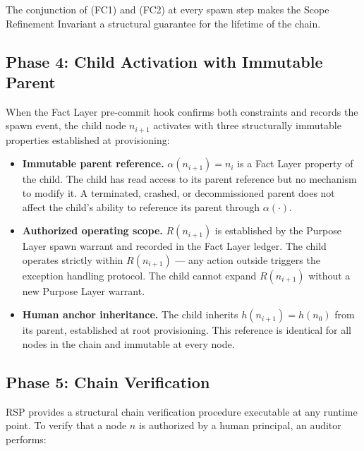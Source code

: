 The conjunction of (FC1) and (FC2) at every spawn step makes the Scope Refinement Invariant a structural guarantee for the lifetime of the chain.

\subsection{Phase 4: Child Activation with Immutable Parent}
\label{sec:rs-phase4}

When the Fact Layer pre-commit hook confirms both constraints and records the spawn event, the child node $n_{i+1}$ activates with three structurally immutable properties established at provisioning:

\begin{itemize}
    \item \textbf{Immutable parent reference.} $\alpha(n_{i+1}) = n_i$ is a Fact Layer property of the child. The child has read access to its parent reference but no mechanism to modify it. A terminated, crashed, or decommissioned parent does not affect the child's ability to reference its parent through $\alpha(\cdot)$.
    \item \textbf{Authorized operating scope.} $R(n_{i+1})$ is established by the Purpose Layer spawn warrant and recorded in the Fact Layer ledger. The child operates strictly within $R(n_{i+1})$ — any action outside triggers the exception handling protocol. The child cannot expand $R(n_{i+1})$ without a new Purpose Layer warrant.
    \item \textbf{Human anchor inheritance.} The child inherits $h(n_{i+1}) = h(n_0)$ from its parent, established at root provisioning. This reference is identical for all nodes in the chain and immutable at every node.
\end{itemize}

\subsection{Phase 5: Chain Verification}
\label{sec:rs-phase5}

RSP provides a structural chain verification procedure executable at any runtime point. To verify that a node $n$ is authorized by a human principal, an auditor performs:

